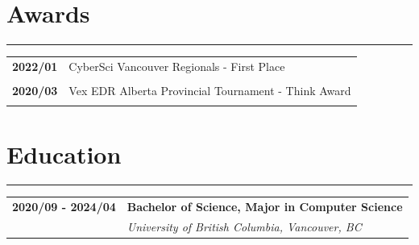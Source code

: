 \documentclass[letterpaper]{article}
\newcommand{\sect}[1]{\section*{#1}
                        {\color{cyan}
                        \rule{\textwidth}{1pt}
                        \vspace{-1ex}}}
\begin{document}
    \sect{Awards}

        \begin{tabular}{p{} p{}}
            \textbf{2022/01} & CyberSci Vancouver Regionals - First Place \\
            \\
            \textbf{2020/03} & Vex EDR Alberta Provincial Tournament - Think Award \\
            \\
        \end{tabular}

    \sect{Education}

        \begin{tabular}{p{} p{}}
            \textbf{2020/09 - 2024/04} & \large\textbf{Bachelor of Science, Major in Computer Science} \\
            & \emph{University of British Columbia, Vancouver, BC} \\
        \end{tabular}
\end{document}
